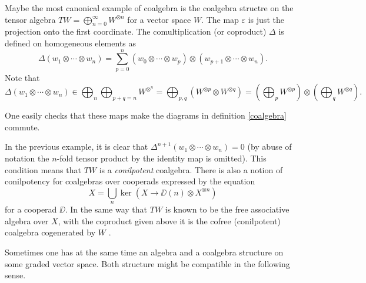 \documentclass[TFM.tex]{subfiles}
\begin{document}
\begin{ex}\label{cofree}
Maybe the most canonical example of coalgebra is the coalgebra structre on the tensor algebra $TW=\bigoplus_{n=0}^\infty W^{\otimes n}$ for a vector space $W$. The map $\varepsilon$ is just the projection onto the first coordinate. The comultiplication (or coproduct) $\Delta$ is defined on homogeneous elements as
\[
\Delta(w_1\otimes\cdots\otimes w_n)=\sum_{p=0}^n(w_0\otimes\cdots \otimes w_p)\otimes (w_{p+1}\otimes\cdots\otimes w_n).
\]
Note that $$\Delta(w_1\otimes\cdots\otimes w_n)\in\bigoplus_n\bigoplus_{p+q=n}W^{\otimes^n}=\bigoplus_{p,q}\left(W^{\otimes p}\otimes W^{\otimes q}\right)=\left(\bigoplus_p W^{\otimes p}\right)\otimes \left(\bigoplus_q W^{\otimes q}\right).$$ 

One easily checks that these maps make the diagrams in definition \ref{coalgebra} commute.
\end{ex}

In the previous example, it is clear that $\Delta^{n+1}(w_1\otimes\cdots\otimes w_n)=0$ (by abuse of notation the $n$-fold tensor product by the identity map is omitted). This condition means that $TW$ is a \emph{conilpotent} coalgebra. There is also a notion of conilpotency for coalgebras over cooperads expressed by the equation
\[
X=\bigcup_n\ker(X\to \DD(n)\otimes X^{\otimes n})
\]
for a cooperad $\DD$. In the same way that $TW$ is known to be the free associative algebra over $X$, with the coproduct given above it is the cofree (conilpotent) coalgebra cogenerated by $W$ \cite[Proposition 2.1 of .6]{AlgebraicOperads}.

Sometimes one has at the same time an algebra and a coalgebra structure on some graded vector space. Both structure might be compatible in the following sense.
\end{document}
